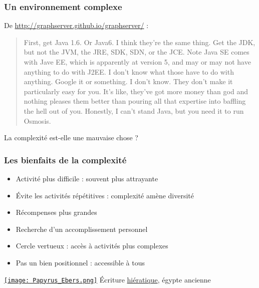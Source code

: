 \documentclass[english, french]{beamer}
\begin{document}
\begin{frame}
	\frametitle{Un environnement complexe}
	De \url{http://graphserver.github.io/graphserver/} :
	\begin{quote}
		First, get Java 1.6. Or Java6. I think they're the same thing. Get the JDK, but not the JVM, the JRE, SDK, SDN, or the JCE. Note Java SE comes with Jave EE, which is apparently at version 5, and may or may not have anything to do with J2EE. I don't know what those have to do with anything. Google it or something. I don't know. They don't make it particularly easy for you. It's like, they've got more money than god and nothing pleases them better than pouring all that expertise into baffling the hell out of you. Honestly, I can't stand Java, but you need it to run Osmosis.
	\end{quote}
	La complexité est-elle une mauvaise chose ?
\end{frame}

\begin{frame}
	\frametitle{Les bienfaits de la complexité}
	\begin{minipage}{6cm}
		\begin{itemize}
			\item Activité plus difficile : souvent plus attrayante
			\item Évite les activités répétitives : complexité amène diversité
			\item Récompenses plus grandes
			\item Recherche d’un accomplissement personnel
			\item Cercle vertueux : accès à activités plus complexes
			\item Pas un bien positionnel : accessible à tous
		\end{itemize}
	\end{minipage}\hspace{5mm}%
	\begin{minipage}{\columnwidth-6.5cm}
		\href{https://fr.wikipedia.org/wiki/\%C3\%89criture_hi\%C3\%A9ratique}{\texttt{[image: Papyrus\_Ebers.png]}}
		\small{Écriture \href{https://en.wikipedia.org/wiki/Hieratic}{hiératique}, égypte ancienne}
	\end{minipage}
\end{frame}
\end{document}

